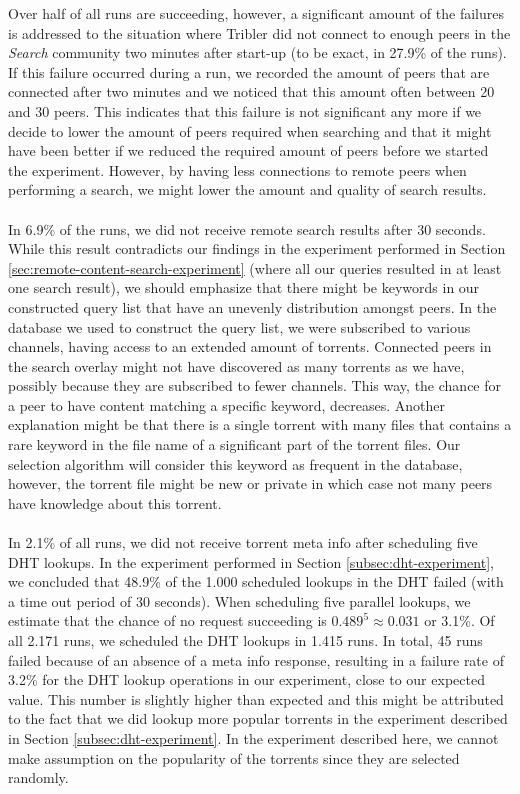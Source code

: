\noindent Over half of all runs are succeeding, however, a significant amount of the failures is addressed to the situation where Tribler did not connect to enough peers in the \emph{Search} community two minutes after start-up (to be exact, in 27.9\% of the runs). If this failure occurred during a run, we recorded the amount of peers that are connected after two minutes and we noticed that this amount often between 20 and 30 peers. This indicates that this failure is not significant any more if we decide to lower the amount of peers required when searching and that it might have been better if we reduced the required amount of peers before we started the experiment. However, by having less connections to remote peers when performing a search, we might lower the amount and quality of search results.\\\\
In 6.9\% of the runs, we did not receive remote search results after 30 seconds. While this result contradicts our findings in the experiment performed in Section \ref{sec:remote-content-search-experiment} (where all our queries resulted in at least one search result), we should emphasize that there might be keywords in our constructed query list that have an unevenly distribution amongst peers. In the database we used to construct the query list, we were subscribed to various channels, having access to an extended amount of torrents. Connected peers in the search overlay might not have discovered as many torrents as we have, possibly because they are subscribed to fewer channels. This way, the chance for a peer to have content matching a specific keyword, decreases. Another explanation might be that there is a single torrent with many files that contains a rare keyword in the file name of a significant part of the torrent files. Our selection algorithm will consider this keyword as frequent in the database, however, the torrent file might be new or private in which case not many peers have knowledge about this torrent.\\\\
In 2.1\% of all runs, we did not receive torrent meta info after scheduling five DHT lookups. In the experiment performed in Section \ref{subsec:dht-experiment}, we concluded that 48.9\% of the 1.000 scheduled lookups in the DHT failed (with a time out period of 30 seconds). When scheduling five parallel lookups, we estimate that the chance of no request succeeding is $ 0.489^5 \approx 0.031 $ or 3.1\%. Of all 2.171 runs, we scheduled the DHT lookups in 1.415 runs. In total, 45 runs failed because of an absence of a meta info response, resulting in a failure rate of 3.2\% for the DHT lookup operations in our experiment, close to our expected value. This number is slightly higher than expected and this might be attributed to the fact that we did lookup more popular torrents in the experiment described in Section \ref{subsec:dht-experiment}. In the experiment described here, we cannot make assumption on the popularity of the torrents since they are selected randomly.\\\\
